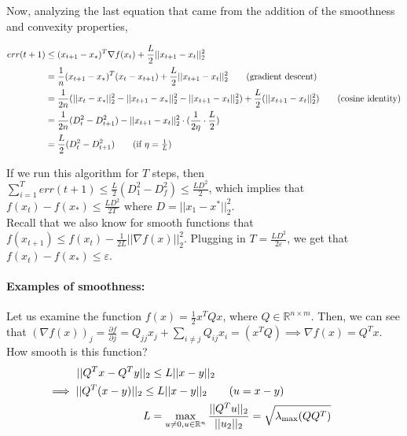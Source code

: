 \documentclass[11pt]{article}
\newcommand{\R}{\mathbb{R}}
\begin{document}
Now, analyzing the last equation that came from the addition of the smoothness and convexity properties,

\begin{align*}
    err(t+1) &\leq (x_{t+1} - x_*)^T \nabla f(x_t) + \frac{L}{2} ||x_{t+1} - x_t||_2^2 \\
    &= \frac{1}{n}(x_{t+1} - x_*)^T(x_t-x_{t+1}) + \frac{L}{2} ||x_{t+1} - x_t||^2_2 \tag{gradient descent} \\
    &= \frac{1}{2n}(||x_t-x_*||_2^2 - ||x_{t+1} - x_*||_2^2 - ||x_{t+1} - x_t||_2^2) + \frac{L}{2}(||x_{t+1} - x_t||_2^2) \tag{cosine identity} \\ 
    &= \frac{1}{2n}(D^2_t-D^2_{t+1}) - ||x_{t+1} - x_t||^2_2 \cdot (\frac{1}{2\eta} \cdot \frac{L}{2}) \\
    &= \frac{L}{2}(D_t^2 - D_{t+1}^2) \tag{if $\eta = \frac{1}{L}$} 
\end{align*}

If we run this algorithm for $T$ steps, then $\sum_{i=1}^T err(t+1) \leq \frac{L}{2}(D^2_1 - D_f^2) \leq \frac{LD^2}{2}$, which implies that $f(x_t) - f(x_*) \leq \frac{LD^2}{2T}$ where $D = ||x_1 - x^*||_2^2$. \\

Recall that we also know for smooth functions that $f(x_{t+1}) \leq f(x_t) - \frac{1}{2L}||\nabla f(x)||^2_2$. Plugging in $T = \frac{LD^2}{2\varepsilon}$, we get that $f(x_t) - f(x_*) \leq \varepsilon$.



\paragraph{Examples of smoothness: } 
Let us examine the function $f(x) = \frac{1}{2}x^TQx$, where $Q\in \R^{n \times m}$. Then, we can see that $(\nabla f(x))_j = \frac{\partial f}{\partial j} = Q_{jj}x_j + \sum_{i \neq j} Q_{ij}x_{i} = (x^TQ)\implies \nabla f(x) = Q^T x$. \\
How smooth is this function? \\
\begin{align*}
    ||Q^Tx-Q^Ty||_2 &\leq L||x-y||_2 \\
    &\hspace{-33.5mm}\implies ||Q^T(x-y)||_2 \leq L||x-y||_2 \tag{$u = x-y$} \\
    L &= \max_{u\neq 0, u\in \R^n} \frac{||Q^Tu||_2}{||u_2||_2} = \sqrt{\lambda_{\text{max}}(QQ^T)}\\
\end{align*}
\end{document}
